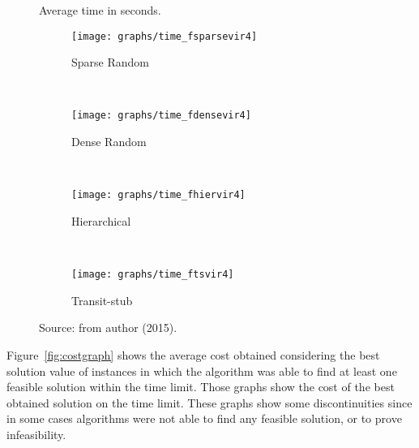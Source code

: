 \begin{figure*}
        \centering
        \caption{Average time in seconds.}\label{fig:timegraph}
        \begin{subfigure}[b]{0.480\textwidth}
                \caption{Sparse Random}
                \texttt{[image: graphs/time\_fsparsevir4]}
                \label{fig:s11}
        \end{subfigure}
        ~ 
        \begin{subfigure}[b]{0.48\textwidth}
                \caption{Dense Random}
                \texttt{[image: graphs/time\_fdensevir4]}
                \label{fig:d11}
        \end{subfigure}
        \\
        \begin{subfigure}[b]{0.48\textwidth}
                \caption{Hierarchical}
                \texttt{[image: graphs/time\_fhiervir4]}
                \label{fig:h11}
        \end{subfigure}
        ~ 
        \begin{subfigure}[b]{0.48\textwidth}
                \caption{Transit-stub}
                \texttt{[image: graphs/time\_ftsvir4]}
                \label{fig:tstime}
        \end{subfigure}
\caption*{Source: from author (2015).}\end{figure*}

Figure~\ref{fig:costgraph} shows the average cost obtained considering the best solution value of instances in which the algorithm was able to find at least one feasible solution within the time limit.
Those graphs show the cost of the best obtained solution on the time limit. 
These graphs show some discontinuities since in some cases algorithms were not able to find any feasible solution, or to prove infeasibility.


